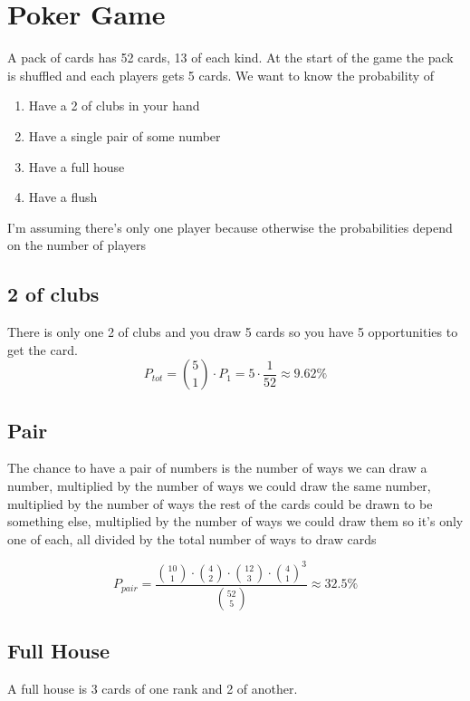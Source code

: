 \clearpage
\section{Poker Game}
\begin{colbox}
	A pack of cards has 52 cards, 13 of each kind. At the start of the game the pack is shuffled and each players gets 5 cards. We want to know the probability of
	\begin{enumerate}
		\item Have a 2 of clubs in your hand
		\item Have a single pair of some number
		\item Have a full house
		\item Have a flush
	\end{enumerate}
\end{colbox}

I'm assuming there's only one player because otherwise the probabilities depend on the number of players

\subsection{2 of clubs}
There is only one 2 of clubs and you draw 5 cards so you have 5 opportunities to get the card. 
\begin{equation}
	P_{tot} = \binom{5}{1} \cdot P_{1} = 5 \cdot \frac{1}{52} \approx 9.62\%
\end{equation}

\subsection{Pair}
The chance to have a pair of numbers is the number of ways we can draw a number, multiplied by the number of ways we could draw the same number, multiplied by the number of ways the rest of the cards could be drawn to be something else, multiplied by the number of ways we could draw them so it's only one of each, all divided by the total number of ways to draw cards

\begin{equation}
	P_{pair} = \frac{\binom{10}{1}\cdot\binom{4}{2}\cdot\binom{12}{3}\cdot\binom{4}{1}^3}{\binom{52}{5}} \approx 32.5\%
\end{equation}

\subsection{Full House}
A full house is 3 cards of one rank and 2 of another. 

